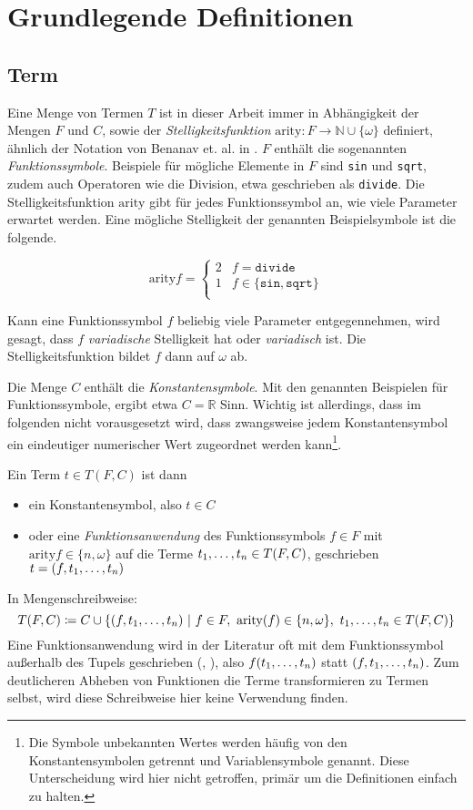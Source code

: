 


\section{Grundlegende Definitionen} \label{secGrundlegendeDefinitionen}

\subsection{Term}
Eine Menge von Termen $T$ ist in dieser Arbeit immer  in Abhängigkeit der Mengen $F$ und $C$, sowie der \emph{Stelligkeitsfunktion} $\mathrm{arity} \colon F \rightarrow \mathbb{N} \cup \{\omega\}$ definiert, ähnlich der Notation von Benanav et. al. in \cite{NPHardMatching}. $F$ enthält die sogenannten \emph{Funktionssymbole}. Beispiele für mögliche Elemente in $F$ sind \texttt{sin} und \texttt{sqrt}, zudem auch Operatoren wie die Division, etwa geschrieben als \texttt{divide}. Die Stelligkeitsfunktion $\mathrm{arity}$ gibt für jedes Funktionssymbol an, wie viele Parameter erwartet werden. Eine mögliche Stelligkeit der genannten Beispielsymbole ist die folgende.

$$\mathrm{arity} f = \begin{cases}
2 & f  = \texttt{divide}\\
1 & f \in \{\texttt{sin}, \texttt{sqrt}\}\\
\end{cases}$$

Kann eine Funktionssymbol $f$ beliebig viele Parameter entgegennehmen, wird gesagt, dass $f$ \emph{variadische} Stelligkeit hat oder \emph{variadisch} ist. Die Stelligkeitsfunktion bildet $f$ dann auf $\omega$ ab. 

Die Menge $C$ enthält die \emph{Konstantensymbole}. Mit den genannten Beispielen für Funktionssymbole, ergibt etwa $C = \mathbb R$ Sinn. Wichtig ist allerdings, dass im folgenden nicht vorausgesetzt wird, dass zwangsweise jedem Konstantensymbol ein eindeutiger numerischer Wert zugeordnet werden kann\footnote{Die Symbole unbekannten Wertes werden häufig von den Konstantensymbolen getrennt und Variablensymbole genannt. Diese Unterscheidung wird hier nicht getroffen, primär um die Definitionen einfach zu halten.}.



Ein Term $t \in T(F, C)$ ist dann  {
\begin{itemize}
	\item{ein Konstantensymbol, also $t \in C$}
	\item{oder eine \emph{Funktionsanwendung} des Funktionssymbols $f \in F$ mit $\mathrm{arity} f \in \{n, \omega\}$ 
		auf die Terme ${\tOneN \in T(F, C)}$, geschrieben ${t = (f, \tOneN)}$}
\end{itemize}}
In Mengenschreibweise:
$$T(F, C) \coloneqq C \cup \curl*{
(f, \tOneN)~|
~f\in F,~\mathrm{arity}(f) \in \{n, \omega\},~ \tOneN \in T(F, C)
}$$ 
Eine Funktionsanwendung wird in der Literatur oft mit dem Funktionssymbol außerhalb des Tupels geschrieben (\cite{buch1977}, \cite{NPHardMatching}), also $f(\tOneN)$ statt $(f, \tOneN)$. Zum deutlicheren Abheben von Funktionen die Terme transformieren zu Termen selbst, wird diese Schreibweise hier keine Verwendung finden. 


